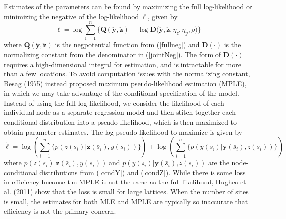 \documentclass[12pt, a4paper, twoside]{article}
\begin{document}
Estimates of the parameters can be found by maximizing the full log-likelihood or minimizing the negative of the log-likelihood $\boldsymbol{\ell}$, given by
\begin{equation} \label{fullLogLik}
\boldsymbol{\ell} = \log\sum_{i=1}^{n} \lbrace\boldsymbol{Q(\utilde{y},\utilde{z})} - \log\boldsymbol{D(\utilde{y},\utilde{z}},\eta_z,\eta_y,\rho)\rbrace
\end{equation}
where $\boldsymbol{Q(\utilde{y},\utilde{z})}$ is the negpotential function from (\ref{fullneg}) and $\boldsymbol{D(\cdot)}$ is the normalizing constant from the denominator in (\ref{jointNeg}). The form of $\boldsymbol{D(\cdot)}$ requires a high-dimensional integral for estimation, and is intractable for more than a few locations. To avoid computation issues with the normalizing constant, Besag (1975) instead proposed maximum pseudo-likelihood estimation (MPLE), in which we may take advantage of the conditional specification of the model. Instead of using the full log-likelihood, we consider the likelihood of each individual node as a separate regression model and then stitch together each conditional distribution into a pseudo-likelihood, which is then maximized to obtain parameter estimates. The log-pseudo-likelihood to maximize is given by
\begin{equation}\label{logplik}
\tilde{\boldsymbol{\ell}} = \log\left(\sum_{i=1}^{n} \lbrace{p(z(s_{i}) | \boldsymbol{z}(\bar{s}_i) , y(s_{i}))}\rbrace\right) + \log\left(\sum_{i=1}^{n} \lbrace{p(y(s_{i}) | \boldsymbol{y}(\bar{s}_i), z(s_{i}))}\rbrace\right)
\end{equation}
where $p(z(s_{i}) | \boldsymbol{z}(\bar{s}_i) , y(s_{i}))$ and $p(y(s_{i}) | \boldsymbol{y}(\bar{s}_i), z(s_{i}))$ are the node-conditional distributions from (\ref{condY}) and (\ref{condZ}). While there is some loss in efficiency because the MPLE is not the same as the full likelihood, Hughes et al. (2011) show that the loss is small for large lattices. When the number of sites is small, the estimates for both MLE and MPLE are typically so inaccurate that efficiency is not the primary concern.
\end{document}
